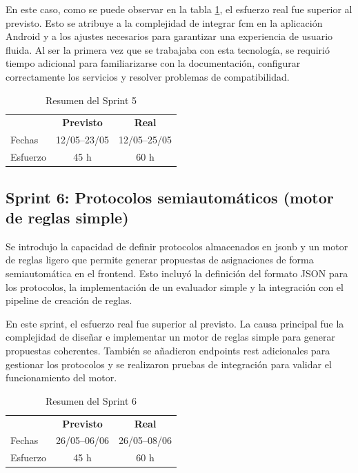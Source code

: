 En este caso, como se puede observar en la tabla \ref{tab:sprint5}, el esfuerzo real fue superior al previsto. Esto se atribuye a la complejidad de integrar \acrshort{fcm} en la aplicación Android y a los ajustes necesarios para garantizar una experiencia de usuario fluida. Al ser la primera vez que se trabajaba con esta tecnología, se requirió tiempo adicional para familiarizarse con la documentación, configurar correctamente los servicios y resolver problemas de compatibilidad.

\begin{table}[H]
  \centering
  \begin{tabular}{l|c|c}
    \rowcolor{udcpink!25}
    \textbf{} & \textbf{Previsto} & \textbf{Real} \\
    Fechas & 12/05--23/05 & 12/05--25/05 \\
    Esfuerzo & 45 h & 60 h \\
  \end{tabular}
  \caption{Resumen del Sprint 5}
  \label{tab:sprint5}
\end{table}

\subsection{Sprint 6: Protocolos semiautomáticos (motor de reglas simple)}
Se introdujo la capacidad de definir protocolos almacenados en \acrshort{jsonb} y un motor de reglas ligero que permite generar propuestas de asignaciones de forma semiautomática en el frontend. Esto incluyó la definición del formato JSON para los protocolos, la implementación de un evaluador simple y la integración con el pipeline de creación de reglas.

En este sprint, el esfuerzo real fue superior al previsto. La causa principal fue la complejidad de diseñar e implementar un motor de reglas simple para generar propuestas coherentes. También se añadieron endpoints \acrshort{rest} adicionales para gestionar los protocolos y se realizaron pruebas de integración para validar el funcionamiento del motor.

\begin{table}[H]
  \centering
  \begin{tabular}{l|c|c}
    \rowcolor{udcpink!25}
    \textbf{} & \textbf{Previsto} & \textbf{Real} \\
    Fechas & 26/05--06/06 & 26/05--08/06 \\
    Esfuerzo & 45 h & 60 h \\
  \end{tabular}
  \caption{Resumen del Sprint 6}
  \label{tab:sprint6}
\end{table}

